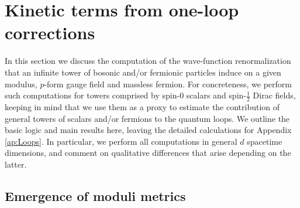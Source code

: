 \section{Kinetic terms from one-loop corrections}
\label{s:selfenergybosons}	

In this section we discuss the  computation of the wave-function renormalization that an infinite tower of bosonic and/or fermionic particles induce on a given modulus, $p$-form gauge field and massless fermion. For concreteness, we perform such computations for towers comprised by spin-0 scalars and spin-$\frac{1}{2}$ Dirac fields, keeping in mind that we use them as a proxy to estimate the contribution of general towers of scalars and/or fermions to the quantum loops. We outline the basic logic and main results here, leaving the detailed calculations for Appendix \ref{ap:Loops}. In particular, we perform all computations in general $d$ spacetime dimensions, and comment on qualitative differences that arise depending on the latter.

\subsection{Emergence of moduli metrics}
\label{ss:Emergencemodulus}
	
